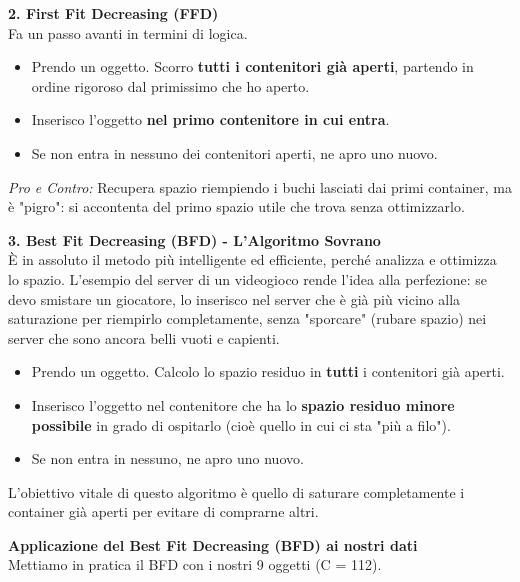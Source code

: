 \documentclass[12pt, a4paper]{article}
\begin{document}
	\vspace{0.3cm}
	\textbf{2. First Fit Decreasing (FFD)}\\
	Fa un passo avanti in termini di logica. 
	\begin{itemize}[label=$\circ$, itemsep=1pt]
		\item Prendo un oggetto. Scorro \textbf{tutti i contenitori già aperti}, partendo in ordine rigoroso dal primissimo che ho aperto.
		\item Inserisco l'oggetto \textbf{nel primo contenitore in cui entra}.
		\item Se non entra in nessuno dei contenitori aperti, ne apro uno nuovo.
	\end{itemize}
	\textit{Pro e Contro:} Recupera spazio riempiendo i buchi lasciati dai primi container, ma è "pigro": si accontenta del primo spazio utile che trova senza ottimizzarlo.
	
	\vspace{0.3cm}
	\textbf{3. Best Fit Decreasing (BFD) - L'Algoritmo Sovrano}\\
	È in assoluto il metodo più intelligente ed efficiente, perché analizza e ottimizza lo spazio. L'esempio del server di un videogioco rende l'idea alla perfezione: se devo smistare un giocatore, lo inserisco nel server che è già più vicino alla saturazione per riempirlo completamente, senza "sporcare" (rubare spazio) nei server che sono ancora belli vuoti e capienti.
	
	\begin{itemize}[label=$\circ$, itemsep=1pt]
		\item Prendo un oggetto. Calcolo lo spazio residuo in \textbf{tutti} i contenitori già aperti.
		\item Inserisco l'oggetto nel contenitore che ha lo \textbf{spazio residuo minore possibile} in grado di ospitarlo (cioè quello in cui ci sta "più a filo").
		\item Se non entra in nessuno, ne apro uno nuovo.
	\end{itemize}
	L'obiettivo vitale di questo algoritmo è quello di saturare completamente i container già aperti per evitare di comprarne altri.
	
	\vspace{0.4cm}
	\textbf{Applicazione del Best Fit Decreasing (BFD) ai nostri dati}\\
	Mettiamo in pratica il BFD con i nostri 9 oggetti (C = 112).
	
\end{document}
